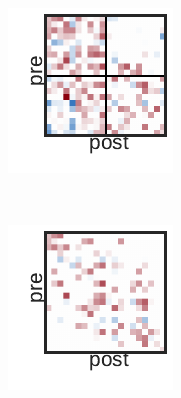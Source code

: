 \begin{figure}[t!]
\begin{subfigure}[b]{1.10in}
  \end{subfigure}
  ~
  \begin{subfigure}[b]{1.10in}
    \centering
    \includegraphics[width=\textwidth]{figures/ch3/SBM-Distance.pdf}
  \end{subfigure}
  ~
  \begin{subfigure}[b]{1.10in}
    \centering
    \includegraphics[width=\textwidth]{figures/ch3/Distance-Distance.pdf}

\end{subfigure}
\end{figure}
